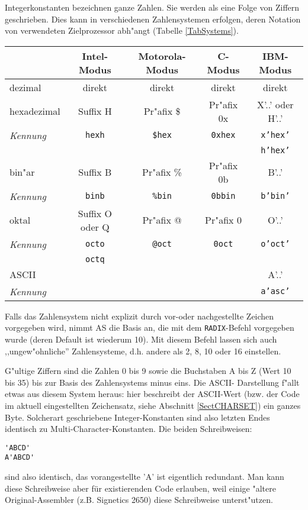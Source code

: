 \documentclass[12pt,a4paper,twoside]{report}
\newcommand{\ii}[1]{{\it #1}}
\newcommand{\tty}[1]{{\tt #1}}
\begin{document}
Integerkonstanten bezeichnen ganze Zahlen.  Sie werden als eine
Folge von Ziffern geschrieben.  Dies kann in verschiedenen
Zahlensystemen erfolgen, deren Notation von verwendeten
Zielprozessor abh"angt (Tabelle
\ref{TabSystems}).
\par
\begin{table*}[htbp]
\begin{center}\begin{tabular}{|l|c|c|c|c|}
\hline
            & Intel-Modus     & Motorola-Modus & C-Modus  & IBM-Modus  \\
\hline
\hline
dezimal     & direkt          & direkt      & direkt      & direkt \\
hexadezimal & Suffix H        & Pr"afix \$  & Pr"afix 0x  & X'..' oder H'..' \\
\ii{Kennung}& \tty{hexh}      & \tty{\$hex} & \tty{0xhex} & \tty{x'hex'} \\
            &                 &             &             & \tty{h'hex'} \\
bin"ar      & Suffix B        & Pr"afix \%  & Pr"afix 0b  & B'..' \\
\ii{Kennung}& \tty{binb}      & \tty{\%bin} & \tty{0bbin} & \tty{b'bin'} \\
oktal       & Suffix O oder Q & Pr"afix @   & Pr"afix 0   & O'..' \\
\ii{Kennung}& \tty{octo}      & \tty{@oct}  & \tty{0oct}  & \tty{o'oct'} \\  
            & \tty{octq}      &             &             & \\
ASCII       &                 &             &             & A'..' \\
\ii{Kennung}&                 &             &             & \tty{a'asc'} \\
\hline
\end{tabular}\end{center}
\caption{definierte Zahlensysteme und Schreibweisen\label{TabSystems}}
\end{table*}
Falls das Zahlensystem nicht explizit durch vor-oder nachgestellte Zeichen
vorgegeben wird, nimmt AS die Basis an, die mit dem {\tt RADIX}-Befehl
vorgegeben wurde (deren Default ist wiederum 10).  Mit diesem Befehl lassen
sich auch ,,ungew"ohnliche'' Zahlensysteme, d.h. andere als 2, 8, 10 oder 16
einstellen.

G"ultige Ziffern sind die Zahlen 0 bis 9 sowie die Buchstaben A bis Z
(Wert 10 bis 35) bis zur Basis des Zahlensystems minus eins.  Die ASCII-
Darstellung f"allt etwas aus diesem System heraus: hier beschreibt der
ASCII-Wert (bzw. der Code im aktuell eingestellten Zeichensatz, siehe
Abschnitt \ref{SectCHARSET}) ein ganzes Byte.  Solcherart geschriebene
Integer-Konstanten sind also letzten Endes identisch zu Multi-Character-Konstanten.
Die beiden Schreibweisen:
\begin{verbatim}
'ABCD'
A'ABCD'
\end{verbatim}
sind also identisch, das vorangestellte 'A' ist eigentlich redundant.  Man
kann diese Schreibweise aber für existierenden Code erlauben, weil einige "altere
Original-Assembler (z.B. Signetics 2650) diese Schreibweise unterst"utzen.
\end{document}
